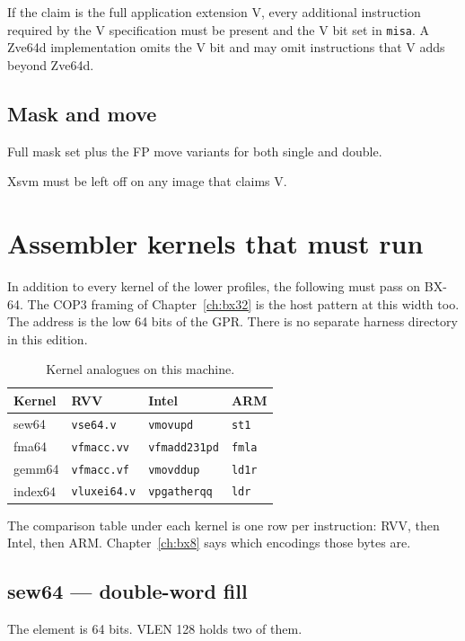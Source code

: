 If the claim is the full application extension V, every additional instruction required by the V specification must be present and the V bit set in \texttt{misa}. A Zve64d implementation omits the V bit and may omit instructions that V adds beyond Zve64d.

\subsection{Mask and move}

Full mask set plus the FP move variants for both single and double.

Xsvm must be left off on any image that claims V.

\section{Assembler kernels that must run}

In addition to every kernel of the lower profiles, the following must pass on BX-64. The COP3 framing of Chapter~\ref{ch:bx32} is the host pattern at this width too. The address is the low 64 bits of the GPR. There is no separate harness directory in this edition.

\begin{table}[htbp]
\centering
\caption{Kernel analogues on this machine.}
\small
\begin{tabular}{@{}llll@{}}
\toprule
Kernel & RVV & Intel & ARM \\
\midrule
sew64 & \texttt{vse64.v} & \texttt{vmovupd} & \texttt{st1} \\
fma64 & \texttt{vfmacc.vv} & \texttt{vfmadd231pd} & \texttt{fmla} \\
gemm64 & \texttt{vfmacc.vf} & \texttt{vmovddup} & \texttt{ld1r} \\
index64 & \texttt{vluxei64.v} & \texttt{vpgatherqq} & \texttt{ldr} \\
\bottomrule
\end{tabular}
\end{table}

The comparison table under each kernel is one row per instruction: RVV, then Intel, then ARM. Chapter~\ref{ch:bx8} says which encodings those bytes are.

\subsection{sew64 --- double-word fill}
The element is 64 bits. VLEN 128 holds two of them.

